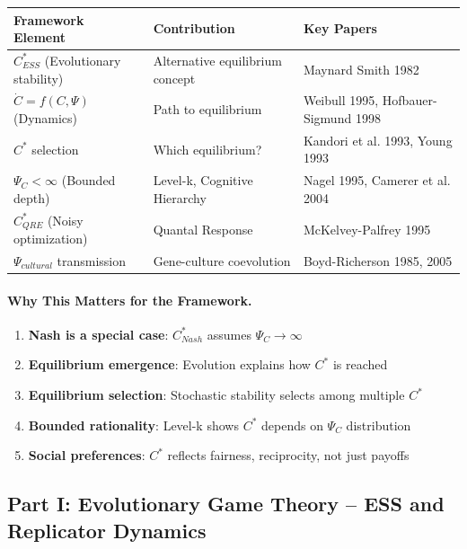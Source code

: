 \begin{center}
\renewcommand{\arraystretch}{1.4}
\begin{tabular}{|l|l|l|}
\hline
\textbf{Framework Element} & \textbf{Contribution} & \textbf{Key Papers} \\
\hline
$C^*_{ESS}$ (Evolutionary stability) & Alternative equilibrium concept & Maynard Smith 1982 \\
$\dot{C} = f(C, \Psi)$ (Dynamics) & Path to equilibrium & Weibull 1995, Hofbauer-Sigmund 1998 \\
$C^*$ selection & Which equilibrium? & Kandori et al. 1993, Young 1993 \\
$\Psi_C < \infty$ (Bounded depth) & Level-k, Cognitive Hierarchy & Nagel 1995, Camerer et al. 2004 \\
$C^*_{QRE}$ (Noisy optimization) & Quantal Response & McKelvey-Palfrey 1995 \\
$\Psi_{cultural}$ transmission & Gene-culture coevolution & Boyd-Richerson 1985, 2005 \\
\hline
\end{tabular}
\end{center}

\paragraph{Why This Matters for the Framework.}
\begin{enumerate}
    \item \textbf{Nash is a special case}: $C^*_{Nash}$ assumes $\Psi_C \to \infty$
    \item \textbf{Equilibrium emergence}: Evolution explains how $C^*$ is reached
    \item \textbf{Equilibrium selection}: Stochastic stability selects among multiple $C^*$
    \item \textbf{Bounded rationality}: Level-k shows $C^*$ depends on $\Psi_C$ distribution
    \item \textbf{Social preferences}: $C^*$ reflects fairness, reciprocity, not just payoffs
\end{enumerate}

\subsection{Part I: Evolutionary Game Theory – ESS and Replicator Dynamics}


